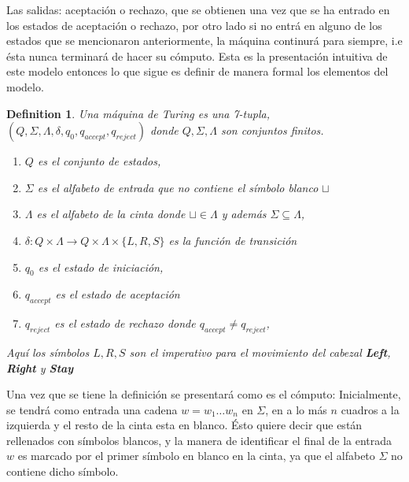 \documentclass[10pt]{report}
\newtheorem{definition}{Definition}
\begin{document}
    Las salidas: aceptación o rechazo, que se obtienen una vez que se ha entrado en los estados de aceptación o rechazo,
    por otro lado si no entrá en alguno de los estados que se mencionaron anteriormente, la máquina continurá para siempre, i.e
    ésta nunca terminará de hacer su cómputo.\newline
    Esta es la presentación intuitiva de este modelo entonces lo que sigue es definir de manera formal los elementos del modelo.

    \newline

    \begin{definition}%
        Una máquina de Turing es una 7-tupla, $(Q,\Sigma,\Lambda,\delta,q_{0},q_{accept},q_{reject})$
        donde $Q,\Sigma,\Lambda$ son conjuntos finitos.
        \begin{enumerate}
            \item $Q$ es el conjunto de estados,
            \item $\Sigma$ es el alfabeto de entrada que no contiene el símbolo blanco $\sqcup$
            \item $\Lambda$ es el alfabeto de la cinta donde  $\sqcup\in\Lambda$ y además $\Sigma\subseteq\Lambda$,
            \item $\delta: Q\times\Lambda \rightarrow Q\times\Lambda\times\{L,R,S\}$ es la función de transición
            \item $q_{0}$ es el estado de iniciación,
            \item $q_{accept}$ es el estado de aceptación
            \item $q_{reject}$ es el estado de rechazo donde $q_{accept} \neq q_{reject}$,

        \end{enumerate}
        Aquí los símbolos $L,R,S$ son el imperativo para el movimiento del cabezal \textbf{Left}, \textbf{Right} y \textbf{Stay}
    \end{definition}
    Una vez que se tiene la definición se presentará como es el cómputo:\newline
    Inicialmente, se tendrá como entrada una cadena $w = w_{1}\dots w_{n}$ en $\Sigma$, en a lo más $n$ cuadros
    a la izquierda y el resto de la cinta esta en blanco. Ésto quiere decir que están rellenados con símbolos blancos,
    y la manera de identificar el final de la entrada $w$ es marcado por el primer símbolo en blanco en la cinta,
    ya que el alfabeto $\Sigma$ no contiene dicho símbolo.
    \newline
\end{document}
